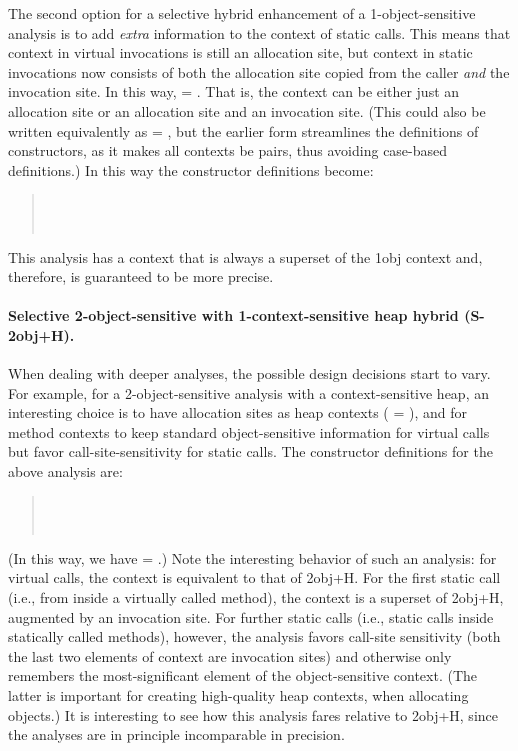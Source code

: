 The second option for a selective hybrid enhancement of a
1-object-sensitive analysis is to add \emph{extra} information to the
context of static calls. This means that context in virtual
invocations is still an allocation site, but context in static
invocations now consists of both the allocation site copied from the
caller \emph{and} the invocation site. In this way,  = . That is, the context can be either
just an allocation site or an allocation site and an invocation
site. (This could also be written equivalently as  = , but the earlier form streamlines the
definitions of constructors, as it makes all contexts be pairs, thus
avoiding case-based definitions.)  In this way the
constructor definitions become:
\begin{quote}
 \\
 \\
\end{quote}
This analysis has a context that is always a superset of the 1obj
context and, therefore, is guaranteed to be more precise.

\paragraph{Selective 2-object-sensitive with 1-context-sensitive heap hybrid (S-2obj+H).}

When dealing with deeper analyses, the possible design decisions start
to vary. For example, for a 2-object-sensitive analysis with a
context-sensitive heap, an interesting choice is to have allocation sites as
heap contexts ( = ), and for method contexts to
keep standard object-sensitive information for virtual calls but favor
call-site-sensitivity for static calls. The constructor definitions for the
above analysis are:
\begin{quote}
 \\
 \\
\end{quote}
(In this way, we have  = .)  Note the interesting
behavior of such an analysis: for virtual calls, the context is
equivalent to that of 2obj+H. For the first static call (i.e., from
inside a virtually called method), the context is a superset of
2obj+H, augmented by an invocation site. For further static calls
(i.e., static calls inside statically called methods), however, the
analysis favors call-site sensitivity (both the last two elements of
context are invocation sites) and otherwise only remembers the
most-significant element of the object-sensitive context. (The latter
is important for creating high-quality heap contexts, when allocating
objects.) It is interesting to see how this analysis fares relative to
2obj+H, since the analyses are in principle incomparable in precision.

